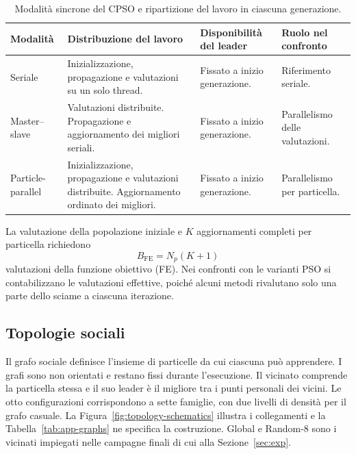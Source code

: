 \begin{table}[!tbp]
\centering\small
\caption{Modalità sincrone del CPSO e ripartizione del lavoro in ciascuna generazione.}
\label{tab:execution-modes}
\begin{tabularx}{\textwidth}{@{}p{2.7cm}X X p{3.25cm}@{}}
\toprule
Modalità & Distribuzione del lavoro & Disponibilità del leader & Ruolo nel confronto \\
\midrule
Seriale & Inizializzazione, propagazione e valutazioni su un solo thread. & Fissato a inizio generazione. & Riferimento seriale. \\
Master--slave & Valutazioni distribuite. Propagazione e aggiornamento dei migliori seriali. & Fissato a inizio generazione. & Parallelismo delle valutazioni. \\
Particle-parallel & Inizializzazione, propagazione e valutazioni distribuite. Aggiornamento ordinato dei migliori. & Fissato a inizio generazione. & Parallelismo per particella. \\
\bottomrule
\end{tabularx}
\end{table}

La valutazione della popolazione iniziale e $K$ aggiornamenti completi per particella richiedono
\begin{equation}
 B_{\mathrm{FE}}=N_p(K+1)
 \label{eq:fe-budget}
\end{equation}
valutazioni della funzione obiettivo (FE). Nei confronti con le varianti PSO si contabilizzano le valutazioni effettive, poiché alcuni metodi rivalutano solo una parte dello sciame a ciascuna iterazione.

\subsection{Topologie sociali}
Il grafo sociale definisce l'insieme di particelle da cui ciascuna può apprendere. I grafi sono non orientati e restano fissi durante l'esecuzione. Il vicinato comprende la particella stessa e il suo leader è il migliore tra i punti personali dei vicini. Le otto configurazioni corrispondono a sette famiglie, con due livelli di densità per il grafo casuale. La Figura~\ref{fig:topology-schematics} illustra i collegamenti e la Tabella~\ref{tab:app-graphs} ne specifica la costruzione. Global e Random-8 sono i vicinati impiegati nelle campagne finali di cui alla Sezione~\ref{sec:exp}.


